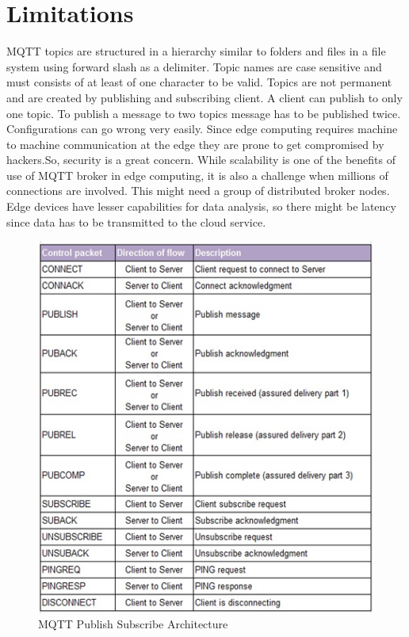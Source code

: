 \documentclass[sigconf]{acmart}
\begin{document}
\section{Limitations}

MQTT topics are structured in a hierarchy similar to folders and files in a file system using forward slash as a delimiter. Topic names are case sensitive and must consists of at least of one character to be valid.
Topics are not permanent and are created by publishing and subscribing client.
A client can publish to only one topic.
To publish a message to two topics message has to be published twice.
Configurations can go wrong very easily. Since edge computing requires machine to machine communication at the edge they are prone to get compromised by hackers.So, security is a great concern. While scalability is one of the benefits of use of MQTT broker in edge computing, it is also a challenge when millions of connections are involved. This might need a group of distributed broker nodes. Edge devices have lesser capabilities for data analysis, so there might be latency since data has to be transmitted to the cloud service. 



\begin{figure}[htb]
\includegraphics[width=1.0\columnwidth]{images/MQTT.png}
\caption{MQTT Publish Subscribe Architecture}




\end{figure}
\end{document}
